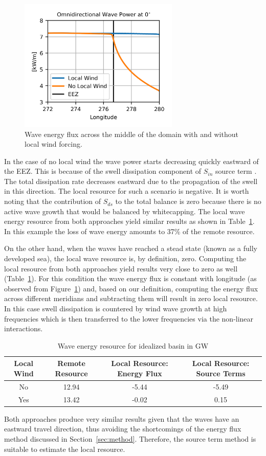 \begin{figure}[ht]
  \centering
  \includegraphics[width=3in]{../../diagram/appendixB_Figure2.png}
  \caption{Wave energy flux across the middle of the domain with and without local wind forcing.}
  \label{fig:idealizedOWP}
\end{figure}

In the case of no local wind the wave power starts decreasing quickly eastward of the EEZ. This is because of the swell dissipation component of $S_{in}$ source term \citep{ardhuinObservationSwellDissipation2009}. The total dissipation rate decreases eastward due to the propagation of the swell in this direction. The local resource for such a scenario is negative. It is worth noting that the contribution of $S_{ds}$ to the total balance is zero because there is no active wave growth that would be balanced by whitecapping. The local wave energy resource from both approaches yield similar results as shown in Table~\ref{table:idealizedResource}. In this example the loss of wave energy amounts to 37\% of the remote resource. 

On the other hand, when the waves have reached a stead state (known as a fully developed sea), the local wave resource is, by definition, zero. Computing the local resource from both approaches yield results very close to zero as well (Table~\ref{table:idealizedResource}). For this condition the wave energy flux is constant with longitude (as observed from Figure~\ref{fig:idealizedOWP}) and, based on our definition, computing the energy flux across different meridians and subtracting them will result in zero local resource. In this case swell dissipation is countered by wind wave growth at high frequencies which is then transferred to the lower frequencies via the non-linear interactions.

\begin{table}[ht]
  \centering
  \begin{tabular}{cccc}
    \hline
    Local Wind & Remote Resource & Local Resource: Energy Flux & Local Resource: Source Terms \\
    \hline
    No  & 12.94 & -5.44 & -5.49 \\
    Yes & 13.42 & -0.02 &  0.15 \\
\hline
  \end{tabular}
  \caption{Wave energy resource for idealized basin in GW}
  \label{table:idealizedResource}
\end{table}

Both approaches produce very similar results given that the waves have an eastward travel direction, thus avoiding the shortcomings of the energy flux method discussed in Section~\ref{sec:method}. Therefore, the source term method is suitable to estimate the local resource.
